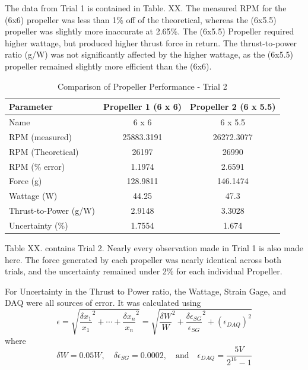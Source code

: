 \documentclass{article}
\begin{document}
The data from Trial 1 is contained in Table. XX.  The measured RPM for the (6x6) propeller was less than 1\% off of the theoretical, whereas the (6x5.5) propeller was slightly more inaccurate at 2.65\%.  The (6x5.5) Propeller required higher wattage, but produced higher thrust force in return.  The thrust-to-power ratio (g/W) was not significantly affected by the higher wattage, as the (6x5.5) propeller remained slightly more efficient than the (6x6).  
  
\begin{table}[H]
  \centering
  \begin{tabular}{lcc}
  \hline
  \textbf{Parameter} & \textbf{Propeller 1 (6 x 6)} & \textbf{Propeller 2 (6 x 5.5)} \\
  \hline
  Name & 6 x 6 & 6 x 5.5 \\
  RPM (measured) & 25883.3191 & 26272.3077 \\
  RPM (Theoretical) & 26197 & 26990 \\
  RPM (\% error) & 1.1974 & 2.6591 \\
  Force (g) & 128.9811 & 146.1474 \\
  Wattage (W) & 44.25 & 47.3 \\
  Thrust-to-Power (g/W) & 2.9148 & 3.3028 \\
  Uncertainty (\%) & 1.7554 & 1.674 \\
  \hline
  \end{tabular}
  \caption{Comparison of Propeller Performance - Trial 2}
  \label{table:propeller_performance2}
  \end{table}

Table XX. contains Trial 2.  Nearly every observation made in Trial 1 is also made here.  The force generated by each propeller was nearly identical across both trials, and the uncertainty remained under 2\% for each individual Propeller.  
  
  For Uncertainty in the Thrust to Power ratio, the Wattage, Strain Gage, and DAQ were all sources of error. It was calculated using \begin{equation}
    \epsilon = \sqrt{ \frac{\delta x_1}{x_1}^2 + \cdots + \frac{\delta x_n}{x_n}^2} = \sqrt{ \frac{\delta W}{W}^2 + \frac{\delta \epsilon_{SG}}{\epsilon_{SG}}^2 + (\epsilon_{DAQ})^2}
   \end{equation}
   where \begin{equation}
    \delta W = 0.05 W, \quad \delta \epsilon_{SG} = 0.0002, \quad \text{and} \quad \epsilon_{DAQ} = \frac{5V}{2^{16}-1} 
  \end{equation} 
\end{document}

